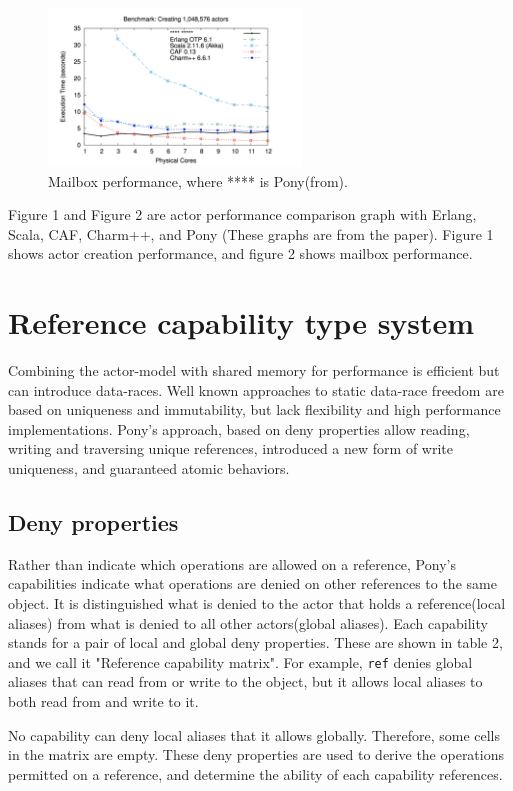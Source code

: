 \documentclass{article}
\begin{document}
\begin{multicols}{2}
\begin{figure}
\centering 		\includegraphics[width=0.6\textwidth]{b}
\caption{Mailbox performance, where **** is Pony(from\cite{type-proof-paper}).}
\end{figure}


Figure 1 and Figure 2 are actor performance comparison graph with Erlang, Scala, CAF\cite{caf}, Charm++, and Pony (These graphs are from the paper\cite{type-proof-paper}).
Figure 1 shows actor creation performance, and figure 2 shows mailbox performance.


\section{Reference capability type system}
Combining the actor-model with shared memory for performance is efficient but can introduce data-races. Well known approaches to static data-race freedom are based on uniqueness and immutability, but lack flexibility and high performance implementations. Pony's approach, based on deny properties allow reading, writing and traversing unique references, introduced a new form of write uniqueness, and guaranteed atomic behaviors.

\subsection{Deny properties}
Rather than indicate which operations are allowed on a reference, Pony's capabilities indicate what operations are denied on other references to the same object. It is distinguished what is denied to the actor that holds a reference(local aliases) from what is denied to all other actors(global aliases). Each capability stands for a pair of local and global deny properties.
These are shown in table 2, and we call it "Reference capability matrix". For example, \texttt{ref} denies global aliases that can read from or write to the object, but it allows local aliases to both read from and write to it.

No capability can deny local aliases that it allows globally.  Therefore, some cells in the matrix are empty.
These deny properties are used to derive the operations permitted on a reference, and determine the ability of each capability references. \\


\end{multicols}
\end{document}
